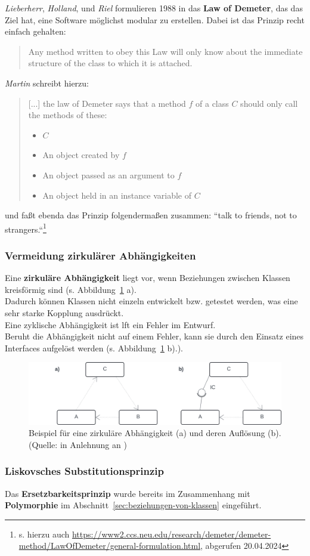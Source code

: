 \textit{Lieberherr}, \textit{Holland}, und \textit{Riel} formulieren 1988 in \cite{LHR88} das \textbf{Law of Demeter}, das das Ziel hat, eine Software möglichst modular zu erstellen.
Dabei ist das Prinzip recht einfach gehalten:

\blockquote[{\cite[325]{LHR88}}]{
    Any method written to obey this Law will only know about the immediate structure of the class to which it is attached.
}

\noindent
\textit{Martin} schreibt hierzu:

\blockquote[{\cite[97 f.]{Mar08}}]{
[...] the law of Demeter says that a method $f$ of a class $C$ should only call the methods of these:
\begin{itemize}
    \item $C$
    \item An object created by $f$
    \item An object passed as an argument to $f$
    \item An object held in an instance variable of $C$
\end{itemize}
}
\noindent
und faßt ebenda das Prinzip folgendermaßen zusammen: ``talk to friends, not to strangers.``\footnote{
s. hierzu auch \url{https://www2.ccs.neu.edu/research/demeter/demeter-method/LawOfDemeter/general-formulation.html}, abgerufen 20.04.2024
}

\subsubsection*{Vermeidung zirkulärer Abhängigkeiten}
Eine \textbf{zirkuläre Abhängigkeit} liegt vor, wenn Beziehungen zwischen Klassen kreisförmig sind (s. Abbildung~\ref{fig:zirkulaer} a).\\
Dadurch können Klassen nicht einzeln entwickelt bzw. getestet werden, was eine sehr starke Kopplung ausdrückt.\\
Eine zyklische Abhängigkeit ist lft ein Fehler im Entwurf.\\
Beruht die Abhängigkeit nicht auf einem Fehler, kann sie durch den Einsatz eines Interfaces aufgelöst werden (s. Abbildung~\ref{fig:zirkulaer} b).).

\begin{figure}
    \centering
    \includegraphics[scale=0.4]{part two/Objektorientierter Entwurf/img/zirkulaer}
    \caption{
        Beispiel für eine zirkuläre Abhängigkeit (a) und deren Auflösung (b).
        (Quelle: in Anlehnung an \cite[76, Abb. 3.19]{Wed09b})
    }
    \label{fig:zirkulaer}
\end{figure}

\subsubsection*{Liskovsches Substitutionsprinzip}
Das \textbf{Ersetzbarkeitsprinzip} wurde bereits im Zusammenhang mit \textbf{Polymorphie} im Abschnitt~\ref{sec:beziehungen-von-klassen} eingeführt.
